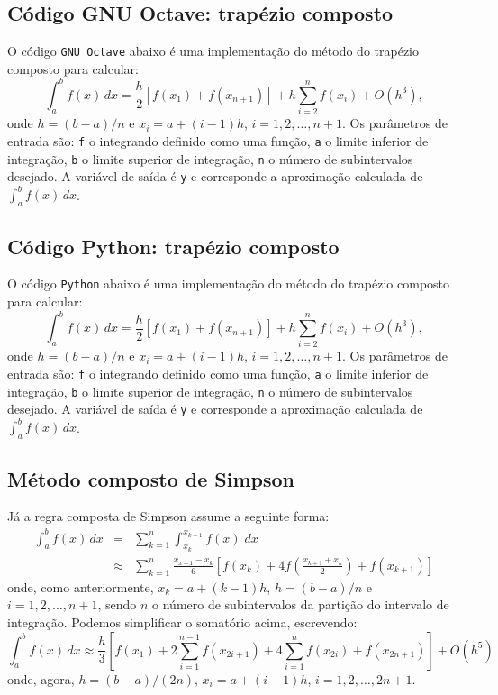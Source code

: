 \subsection{Código GNU Octave: trapézio composto}
O código \verb+GNU Octave+ abaixo é uma implementação do método do trapézio composto para calcular:
\begin{equation}
  \int_a^b f(x)\,dx = \frac{h}{2}\left[f(x_1) + f(x_{n+1})\right] + h\sum_{i=2}^n f(x_i) + O(h^3),
\end{equation}
onde $h = (b-a)/n$ e $x_i = a + (i-1)h$, $i=1,2,\dotsc,n+1$. Os parâmetros de entrada são: \verb+f+ o integrando definido como uma função, \verb+a+ o limite inferior de integração, \verb+b+ o limite superior de integração, \verb+n+ o número de subintervalos desejado. A variável de saída é \verb+y+ e corresponde a aproximação calculada de $\int_a^b f(x)\, dx$.


\fi
\ifispython
\subsection{Código Python: trapézio composto}
O código \verb+Python+ abaixo é uma implementação do método do trapézio composto para calcular:
\begin{equation}
  \int_a^b f(x)\,dx = \frac{h}{2}\left[f(x_1) + f(x_{n+1})\right] + h\sum_{i=2}^n f(x_i) + O(h^3),
\end{equation}
onde $h = (b-a)/n$ e $x_i = a + (i-1)h$, $i=1,2,\dotsc,n+1$. Os parâmetros de entrada são: \verb+f+ o integrando definido como uma função, \verb+a+ o limite inferior de integração, \verb+b+ o limite superior de integração, \verb+n+ o número de subintervalos desejado. A variável de saída é \verb+y+ e corresponde a aproximação calculada de $\int_a^b f(x)\, dx$.

\construirPython

\fi

\subsection{Método composto de Simpson}
Já a regra composta de Simpson assume a seguinte forma:
\begin{eqnarray}
  \int_{a}^b f(x)\,dx &=& \sum_{k=1}^{n} \int_{x_k}^{x_{k+1}} f(x)\;dx \\
  &\approx& \sum_{k=1}^{n} \frac{x_{x+1}-x_k}{6}\left[f(x_k) + 4f\left(\frac{x_{k+1}+x_k}{2}\right)+f(x_{k+1})\right]
\end{eqnarray}
onde, como anteriormente, $x_k = a + (k-1)h$, $h = (b-a)/n$ e $i = 1,2,\dotsc,n+1$, sendo $n$ o número de subintervalos da partição do intervalo de integração. Podemos simplificar o somatório acima, escrevendo:
\begin{equation}
  \int_{a}^b f(x)\,dx \approx \frac{h}{3}\left[f(x_1) + 2\sum_{i=1}^{n-1} f(x_{2i+1}) + 4\sum_{i=1}^{n} f(x_{2i}) + f(x_{2n+1})\right] + O(h^5)
\end{equation}
onde, agora, $h = (b-a)/(2n)$, $x_i = a + (i-1)h$, $i=1,2,\dotsc,2n+1$.

